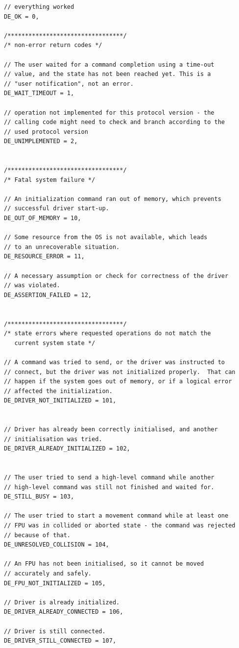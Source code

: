 \documentclass[11pt,a4paper]{report}
\begin{document}
\begin{verbatim}
// everything worked
DE_OK = 0,

/*********************************/
/* non-error return codes */

// The user waited for a command completion using a time-out
// value, and the state has not been reached yet. This is a
// "user notification", not an error.
DE_WAIT_TIMEOUT = 1,

// operation not implemented for this protocol version - the
// calling code might need to check and branch according to the
// used protocol version
DE_UNIMPLEMENTED = 2,


/*********************************/
/* Fatal system failure */

// An initialization command ran out of memory, which prevents
// successful driver start-up.
DE_OUT_OF_MEMORY = 10,

// Some resource from the OS is not available, which leads
// to an unrecoverable situation.
DE_RESOURCE_ERROR = 11,

// A necessary assumption or check for correctness of the driver
// was violated.
DE_ASSERTION_FAILED = 12,


/*********************************/
/* state errors where requested operations do not match the
   current system state */

// A command was tried to send, or the driver was instructed to
// connect, but the driver was not initialized properly.  That can
// happen if the system goes out of memory, or if a logical error
// affected the initialization.
DE_DRIVER_NOT_INITIALIZED = 101,


// Driver has already been correctly initialised, and another
// initialisation was tried.
DE_DRIVER_ALREADY_INITIALIZED = 102,


// The user tried to send a high-level command while another
// high-level command was still not finished and waited for.
DE_STILL_BUSY = 103,

// The user tried to start a movement command while at least one
// FPU was in collided or aborted state - the command was rejected
// because of that.
DE_UNRESOLVED_COLLISION = 104,

// An FPU has not been initialised, so it cannot be moved
// accurately and safely.
DE_FPU_NOT_INITIALIZED = 105,

// Driver is already initialized.
DE_DRIVER_ALREADY_CONNECTED = 106,

// Driver is still connected.
DE_DRIVER_STILL_CONNECTED = 107,


\end{verbatim}
\end{document}
